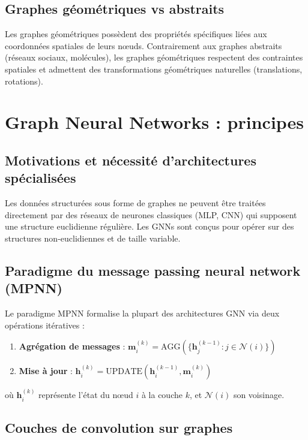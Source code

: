 \subsection{Graphes géométriques vs abstraits}

Les graphes géométriques possèdent des propriétés spécifiques liées aux coordonnées spatiales de leurs nœuds. Contrairement aux graphes abstraits (réseaux sociaux, molécules), les graphes géométriques respectent des contraintes spatiales et admettent des transformations géométriques naturelles (translations, rotations).

\section{Graph Neural Networks : principes}

\subsection{Motivations et nécessité d'architectures spécialisées}

Les données structurées sous forme de graphes ne peuvent être traitées directement par des réseaux de neurones classiques (MLP, CNN) qui supposent une structure euclidienne régulière. Les GNNs sont conçus pour opérer sur des structures non-euclidiennes et de taille variable.

\subsection{Paradigme du message passing neural network (MPNN)}

Le paradigme MPNN formalise la plupart des architectures GNN via deux opérations itératives :
\begin{enumerate}
    \item \textbf{Agrégation de messages} : $\mathbf{m}_i^{(k)} = \text{AGG}(\{\mathbf{h}_j^{(k-1)} : j \in \mathcal{N}(i)\})$
    \item \textbf{Mise à jour} : $\mathbf{h}_i^{(k)} = \text{UPDATE}(\mathbf{h}_i^{(k-1)}, \mathbf{m}_i^{(k)})$
\end{enumerate}
où $\mathbf{h}_i^{(k)}$ représente l'état du nœud $i$ à la couche $k$, et $\mathcal{N}(i)$ son voisinage.

\subsection{Couches de convolution sur graphes}


